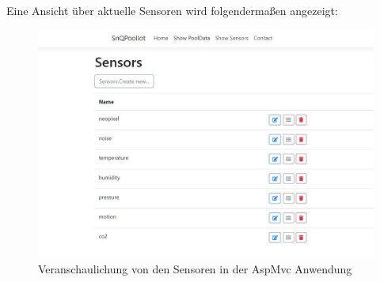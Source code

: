 Eine Ansicht über aktuelle Sensoren wird folgendermaßen angezeigt:

\begin{figure}[H]
    \centering
    \includegraphics[width=1\textwidth]{pics/SensorenInDerAspMvcAnwendung.JPG}  
    \caption{Veranschaulichung von den Sensoren in der AspMvc Anwendung}
\end{figure}